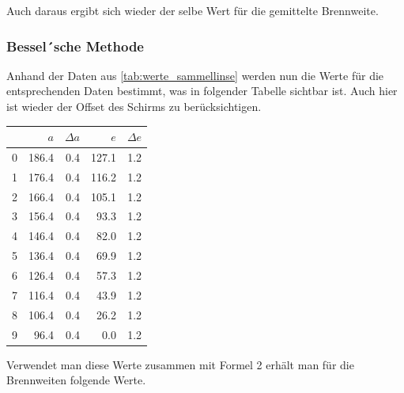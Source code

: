 \documentclass[11pt,ngerman]{scrartcl}
\begin{document}
Auch daraus ergibt sich wieder der selbe Wert für die gemittelte Brennweite.

\newpage

\subsubsection{Bessel´sche Methode}

Anhand der Daten aus \autoref{tab:werte_sammellinse} werden nun die Werte für die entsprechenden Daten bestimmt, was in folgender Tabelle sichtbar ist. Auch hier ist wieder der Offset des Schirms zu berücksichtigen.

\begin{center}
	\begin{tabular}{lrrrr}
		\toprule
		{} & $a$   & $\Delta a$ & $e$   & $\Delta e$ \\
		\midrule
		0  & 186.4 & 0.4        & 127.1 & 1.2        \\
		1  & 176.4 & 0.4        & 116.2 & 1.2        \\
		2  & 166.4 & 0.4        & 105.1 & 1.2        \\
		3  & 156.4 & 0.4        & 93.3  & 1.2        \\
		4  & 146.4 & 0.4        & 82.0  & 1.2        \\
		5  & 136.4 & 0.4        & 69.9  & 1.2        \\
		6  & 126.4 & 0.4        & 57.3  & 1.2        \\
		7  & 116.4 & 0.4        & 43.9  & 1.2        \\
		8  & 106.4 & 0.4        & 26.2  & 1.2        \\
		9  & 96.4  & 0.4        & 0.0   & 1.2        \\
		\bottomrule
	\end{tabular}
\end{center}

Verwendet man diese Werte zusammen mit Formel 2 erhält man für die Brennweiten folgende Werte.
\end{document}
